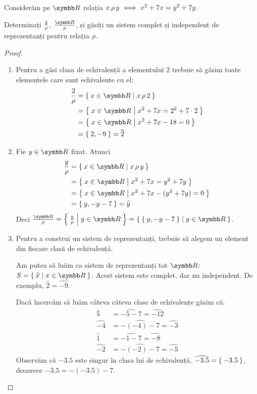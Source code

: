 \begin{exercise}
Considerăm pe \(\reals\) relația \(x \operatorname{\rho} y \iff x^2 + 7x = y^2 + 7y\).

Determinați \(\frac{2}{\operatorname{\rho}}\), \(\frac{\reals}{\rhoequiv}\), și găsiți un sistem complet și independent de reprezentanți pentru relația \(\operatorname{\rho}\).
\end{exercise}
\begin{proof}
~
\begin{enumerate}
    \item Pentru a găsi clasa de echivalență a elementului \(2\) trebuie să găsim toate elementele care sunt echivalente cu el: \begin{align*}
        \frac{2}{\rhoequiv} &= \Set{ x \in \reals | x \rhoequiv 2 } \\
        &= \Set{ x \in \reals | x^2 + 7x = 2^2 + 7 \cdot 2 } \\
        &= \Set{ x \in \reals | x^2 + 7x - 18 = 0 } \\
        &= \Set{ 2, - 9 } = \widehat{2}
    \end{align*}
    \item Fie \(y \in \reals\) fixat. Atunci \begin{align*}
        \frac{y}{\rhoequiv} &= \Set{ x \in \reals | x \rhoequiv y } \\
        &= \Set{ x \in \reals | x^2 + 7x = y^2 + 7y } \\
        &= \Set{ x \in \reals | x^2 + 7x - (y^2 + 7y) = 0 } \\
        &= \Set{ y, - y - 7 } = \widehat{y}
    \end{align*}
    Deci \(\frac{\reals}{\rho} = \Set{ \frac{y}{\rho} | y \in \reals } = \Set{ \Set{ y, - y - 7} | y \in \reals }\).
    \item Pentru a construi un sistem de reprezentanți, trebuie să alegem un element din fiecare clasă de echivalență.
    
    Am putea să luăm ca sistem de reprezentanți tot \(\reals\): \(S = \Set{ \widehat{x} | x \in \reals }\). Acest sistem este complet, dar nu independent. De exemplu, \(\widehat{2} = \widehat{-9}\).
    
    Dacă încercăm să luăm câteva câteva clase de echivalențe găsim că:
    \begin{align*}
        \widehat{5} &= \widehat{-5 - 7} = \widehat{- 12} \\
        \widehat{-4} &= \widehat{- (-4) - 7} = \widehat{-3} \\
        \widehat{1} &= \widehat{-1 - 7} = \widehat{-8} \\
        \widehat{-2} &= \widehat{- (-2) -7} = \widehat{-5}
    \end{align*}
    Observăm că \(-3.5\) este singur în clasa lui de echivalență, \(\widehat{-3.5} = \Set{ -3.5 }\), deoarece \(-3.5 = - (-3.5) - 7\).
    

\end{enumerate}
\end{proof}
